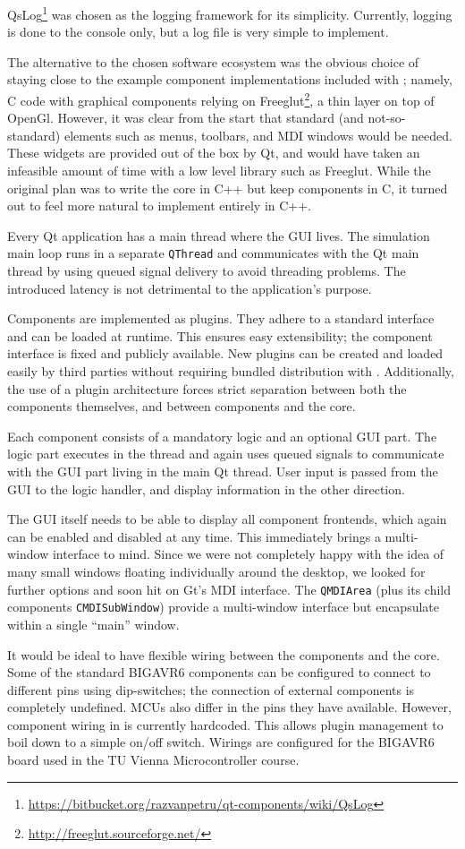 QsLog\footnote{\url{https://bitbucket.org/razvanpetru/qt-components/wiki/QsLog}}
was chosen as the logging framework for its simplicity. Currently, logging is done
to the console only, but a log file is very simple to implement.

The alternative to the chosen software ecosystem was the obvious choice of
staying close to the example component implementations included with \simavr;
namely, C code with graphical components relying on Freeglut\footnote{
%
\url{http://freeglut.sourceforge.net/}
%
}, a thin layer on top of OpenGl. However, it was clear from the start that
standard (and not-so-standard) elements such as menus, toolbars, and \ac{MDI}
windows would be needed. These widgets are provided out of the box by Qt, and
would have taken an infeasible amount of time with a low level library such as
Freeglut. While the original plan was to write the \qsimavr core in C++ but keep
components in C, it turned out to feel more natural to implement entirely in C++.

Every Qt application has a main thread where the \ac{GUI} lives. The \simavr
simulation main loop runs in a separate \lstinline|QThread| and communicates
with the Qt main thread by using queued signal delivery to avoid threading
problems. The introduced latency is not detrimental to the application's purpose.

Components are implemented as plugins. They adhere to a standard interface and
can be loaded at runtime. This ensures easy extensibility; the component interface
is fixed and publicly available. New plugins can be created and loaded easily by
third parties without requiring bundled distribution with \qsimavr. Additionally,
the use of a plugin architecture forces strict separation between both
the components themselves, and between components and the core.

Each component consists of a mandatory logic and an optional \ac{GUI} part.
The logic part executes in the \simavr thread and again uses queued signals
to communicate with the \ac{GUI} part living in the main Qt thread. User input
is passed from the \ac{GUI} to the logic handler, and display information in the
other direction.

The \ac{GUI} itself needs to be able to display all component frontends, which
again can be enabled and disabled at any time. This immediately brings a multi-window
interface to mind. Since we were not completely happy with the idea of many
small windows floating individually around the desktop, we looked for further options
and soon hit on Gt's \ac{MDI} interface. The \lstinline|QMDIArea| (plus its child
components \lstinline|CMDISubWindow|) provide a multi-window interface but
encapsulate within a single ``main'' window.

It would be ideal to have flexible wiring between the components and the core.
Some of the standard BIGAVR6 components can be configured to connect to different
pins using dip-switches; the connection of external components is completely
undefined. \acp{MCU} also differ in the pins they have available. However,
component wiring in \qsimavr is currently hardcoded. This allows plugin management
to boil down to a simple on/off switch. Wirings are configured for the BIGAVR6
board used in the \ac{TU} Vienna Microcontroller course.
